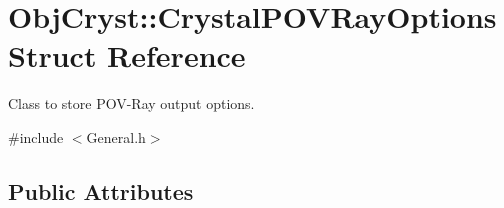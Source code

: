 \hypertarget{struct_obj_cryst_1_1_crystal_p_o_v_ray_options}{}\section{Obj\+Cryst\+::Crystal\+P\+O\+V\+Ray\+Options Struct Reference}
\label{struct_obj_cryst_1_1_crystal_p_o_v_ray_options}


Class to store P\+O\+V-\/\+Ray output options.  




{\ttfamily \#include $<$General.\+h$>$}

\subsection*{Public Attributes}
